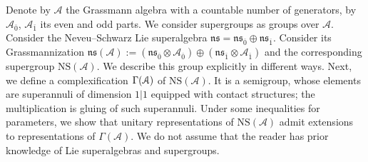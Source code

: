 \documentclass[]{amsart}
\def\cA{\EuScript A}
\begin{document}
{\small
Denote by ${\mathcal A}$ the Grassmann algebra with a countable number of generators, by ${\mathcal A}_{\overline 0}$, ${\mathcal A}_{\overline 1}$
its even and odd parts. We consider supergroups as groups over $\mathcal A$.
 Consider the Neveu--Schwarz Lie superalgebra
$\mathfrak{ns}=
\mathfrak{ns}_{\overline 0}\oplus \mathfrak{ns}_{\overline 1}$. Consider
its Grassmannization $\mathfrak{ns}(\mathcal{A}):=
(\mathfrak{ns}_{\overline 0}\otimes {\mathcal A}_{\overline 0})
\oplus (\mathfrak{ns}_{\overline 1}\otimes {\mathcal A}_{\overline 1})$
and the corresponding supergroup $\mathrm{NS}(\mathcal {A})$.
We describe this group explicitly in different ways.
 Next, we define a
complexification $\Gamma(\cA)$ of $\mathrm{NS}({\mathcal A})$. It is a semigroup,
whose elements are superannuli of dimension $1|1$ equipped with contact structures; the multiplication is gluing of such superannuli. Under some inequalities for parameters,
we
show that  unitary representations of $\mathrm{NS}({\mathcal A})$ admit extensions to representations
of $\Gamma(\mathcal {A})$. We
do not assume that the reader has prior knowledge of 
Lie superalgebras and supergroups.}

\vspace{22pt}
\end{document}
